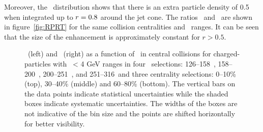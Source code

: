
Moreover, the \DeltaP\ distribution shows that there is an extra particle density of 0.5 when integrated up to $\mbox{$r$} = 0.8$ around the jet cone. 
The ratios \RTheta\ and \RP\  are shown in 
figure~\ref{fig:RPRT} for the same collision centralities and \ptjet\ ranges. It can be seen that the size of the enhancement is approximately constant for $r > 0.5$.

\begin{figure}
   \caption{\DeltaTheta\ (left) and \DeltaP\ (right) as a function of \rvar\ in central collisions for charged-particles with \pt\ < 4 GeV ranges in four \ptjet\ selections: 126--158~\GeV, 158--200~\GeV, 200--251~\GeV, and 251--316~\GeV and three centrality selections: 0--10\% (top), 30--40\% (middle) and 60--80\% (bottom). The vertical bars on the data points indicate statistical uncertainties while the shaded boxes indicate systematic uncertainties. The widths of the boxes are not indicative of the bin size and the points are shifted horizontally for better visibility. }
      \label{fig:deltaPdeltaT}
\end{figure}


